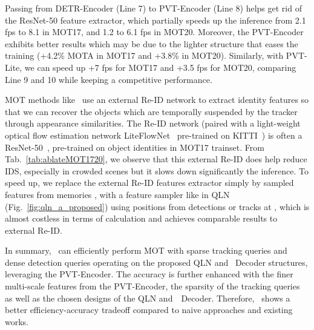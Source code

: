 \begin{table}[ht]
 Passing from DETR-Encoder (Line 7) to PVT-Encoder (Line 8) helps get rid of the ResNet-50 feature extractor, which partially speeds up the inference from 2.1 fps to 8.1 in MOT17, and 1.2 to 6.1 fps in MOT20. Moreover, the PVT-Encoder exhibits better results which may be due to the lighter structure that eases the training (+4.2\% MOTA in MOT17 and +3.8\% in MOT20). Similarly, with PVT-Lite, we can speed up +7 fps for MOT17 and +3.5 fps for MOT20, comparing Line 9 and 10 while keeping a competitive performance.

 MOT methods like~\cite{bergmann2019tracking} use an external Re-ID network to extract identity features so that we can recover the objects which are temporally suspended by the tracker through appearance similarities. The Re-ID network (paired with a light-weight optical flow estimation network LiteFlowNet~\cite{hui2018liteflownet} pre-trained on KITTI~\cite{Geiger2012CVPR}) is often a ResNet-50~\cite{bergmann2019tracking}, pre-trained on object identities in MOT17 trainset. From Tab.~\ref{tab:ablateMOT1720}, we observe that this external Re-ID does help reduce IDS, especially in crowded scenes but it slows down significantly the inference. To speed up, we replace the external Re-ID features extractor simply by sampled features from memories , with a feature sampler like in QLN (Fig.~\ref{fig:qln_a_proposed}) using positions from detections or tracks at , which is almost costless in terms of calculation and achieves comparable results to external Re-ID.


In summary, \method\ can efficiently perform MOT with sparse tracking queries and dense detection queries operating on the proposed QLN and \method\ Decoder structures, leveraging the PVT-Encoder. The accuracy is further enhanced with the finer multi-scale features from the PVT-Encoder, the sparsity of the tracking queries as well as the chosen designs of the QLN and~\method\ Decoder. Therefore, \method\ shows a better efficiency-accuracy tradeoff compared to naive approaches and existing works.


\end{table}
